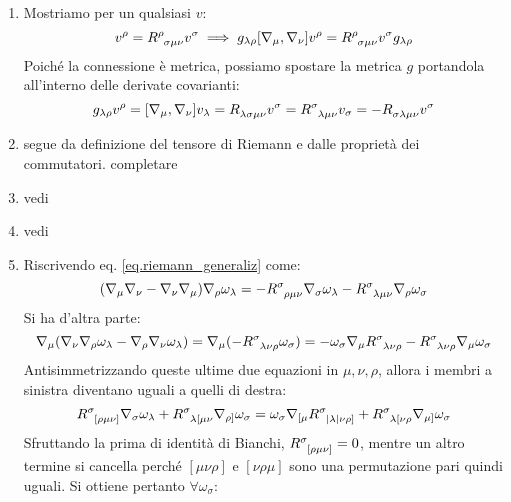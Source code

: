 \begin{enumerate}
    \item Mostriamo per un qualsiasi $v$:
    \begin{equation*}
        [\nabla_\mu,\nabla_\nu]v^\rho = \tensor{R}{^\rho_{\sigma\mu\nu}}v^\sigma \implies g_{\lambda\rho} [\nabla_\mu,\nabla_\nu]v^\rho = \tensor{R}{^\rho_{\sigma\mu\nu}}v^\sigma g_{\lambda\rho}
    \end{equation*}
    Poiché la connessione è metrica, possiamo spostare la metrica $g$ portandola all'interno delle derivate covarianti:
    \begin{equation*}
        [\nabla_\mu,\nabla_\nu]  g_{\lambda\rho} v^\rho =  [\nabla_\mu,\nabla_\nu] v_\lambda =  \tensor{R}{_{\lambda\sigma\mu\nu}}v^\sigma = \tensor{R}{^\sigma_{\lambda\mu\nu}}v_\sigma  = - \tensor{R}{_{\sigma\lambda\mu\nu}}v^\sigma 
    \end{equation*}
    \item segue da definizione del tensore di Riemann e dalle proprietà dei commutatori. completare
    \item vedi \cite{wald}
    \item vedi \cite{wald}
    \item Riscrivendo eq. \ref{eq.riemann_generaliz} come:
    \begin{equation*}
        (\nabla_\mu\nabla_\nu - \nabla_\nu \nabla_\mu) \nabla_\rho \omega_\lambda = - \tensor{R}{^\sigma_{\rho\mu\nu}}\nabla_\sigma \omega_\lambda - \tensor{R}{^\sigma_{\lambda\mu\nu}}\nabla_\rho\omega_\sigma
    \end{equation*}
    Si ha d'altra parte:
    \begin{equation*}
        \nabla_\mu(\nabla_\nu\nabla_\rho \omega_\lambda - \nabla_\rho\nabla_\nu\omega_\lambda) = \nabla_\mu (-\tensor{R}{^\sigma_{\lambda\nu\rho}}\omega_\sigma) = - \omega_\sigma\nabla_\mu\tensor{R}{^\sigma_{\lambda\nu\rho}} - \tensor{R}{^\sigma_{\lambda\nu\rho}}\nabla_\mu\omega_\sigma
    \end{equation*}
    Antisimmetrizzando queste ultime due equazioni in $\mu,\nu,\rho$, allora i membri a sinistra diventano uguali a quelli di destra:
    \begin{equation*}
        \tensor{R}{^\sigma_{[\rho\mu\nu]}} \nabla_\sigma\omega_\lambda + \tensor{R}{^\sigma_{\lambda[\mu\nu}}\nabla_{\rho]}\omega_\sigma = \omega_\sigma\nabla_{[\mu} \tensor{R}{^\sigma_{|\lambda|\nu\rho]}}+ \tensor{R}{^\sigma_{\lambda[\nu\rho}}\nabla_{\mu]}\omega_\sigma
    \end{equation*}
    Sfruttando la prima di identità di Bianchi, $\tensor{R}{^\sigma_{[\rho\mu\nu]}}=0$, mentre un altro termine si cancella perché $[\mu\nu\rho]$ e $[\nu\rho\mu]$ sono una permutazione pari quindi uguali. Si ottiene pertanto $\forall \omega_\sigma$:

\end{enumerate}
